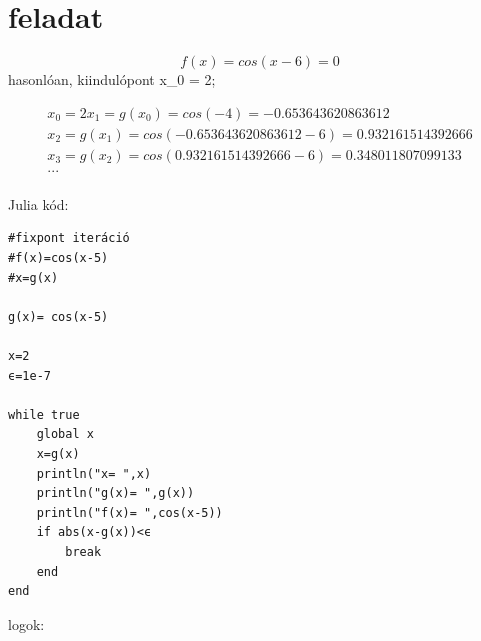 \documentclass{article}
\begin{document}
\section{feladat}
\begin{equation}
f(x)= cos(x-6) =0
\end{equation}
hasonlóan, kiindulópont x_0 = 2; 

\begin{multline}
x_0 = 2
x_1 = g(x_0) = cos(-4) = -0.653643620863612\\
x_2 = g(x_1) = cos(-0.653643620863612-6) = 0.932161514392666\\
x_3 = g(x_2) = cos(0.932161514392666-6) = 0.348011807099133\\
...\\
\end{multline}

Julia kód:

\begin{verbatim}
#fixpont iteráció
#f(x)=cos(x-5)
#x=g(x)

g(x)= cos(x-5)

x=2
ϵ=1e-7

while true
    global x
    x=g(x)
    println("x= ",x)
    println("g(x)= ",g(x))
    println("f(x)= ",cos(x-5))
    if abs(x-g(x))<ϵ
        break
    end
end
\end{verbatim}

logok:
\end{document}
